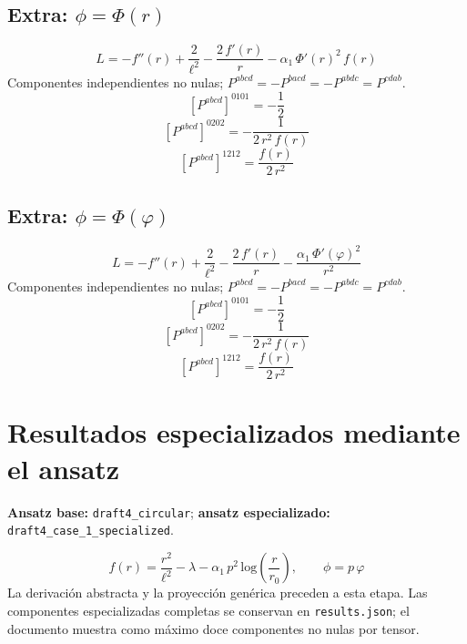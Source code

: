 \documentclass[11pt]{article}
\begin{document}
\subsection*{Extra: $\phi=\Phi\!\left(r\right)$}
\begin{dmath*}[breakdepth={5}]
L=-f''\!\left(r\right) + \frac{2}{{\ell}^{2}} - \frac{2\,f'\!\left(r\right)}{r} - \alpha_{1}\,{\Phi'\!\left(r\right)}^{2}\,f\!\left(r\right)
\end{dmath*}
Componentes independientes no nulas; $P^{abcd}=-P^{bacd}=-P^{abdc}=P^{cdab}$.
\begin{dmath*}[breakdepth={5}]
\left[P^{abcd}\right]^{0101}=-\frac{1}{2}
\end{dmath*}
\begin{dmath*}[breakdepth={5}]
\left[P^{abcd}\right]^{0202}=-\frac{1}{2\,{r}^{2}\,f\!\left(r\right)}
\end{dmath*}
\begin{dmath*}[breakdepth={5}]
\left[P^{abcd}\right]^{1212}=\frac{f\!\left(r\right)}{2\,{r}^{2}}
\end{dmath*}
\subsection*{Extra: $\phi=\Phi\!\left(\varphi\right)$}
\begin{dmath*}[breakdepth={5}]
L=-f''\!\left(r\right) + \frac{2}{{\ell}^{2}} - \frac{2\,f'\!\left(r\right)}{r} - \frac{\alpha_{1}\,{\Phi'\!\left(\varphi\right)}^{2}}{{r}^{2}}
\end{dmath*}
Componentes independientes no nulas; $P^{abcd}=-P^{bacd}=-P^{abdc}=P^{cdab}$.
\begin{dmath*}[breakdepth={5}]
\left[P^{abcd}\right]^{0101}=-\frac{1}{2}
\end{dmath*}
\begin{dmath*}[breakdepth={5}]
\left[P^{abcd}\right]^{0202}=-\frac{1}{2\,{r}^{2}\,f\!\left(r\right)}
\end{dmath*}
\begin{dmath*}[breakdepth={5}]
\left[P^{abcd}\right]^{1212}=\frac{f\!\left(r\right)}{2\,{r}^{2}}
\end{dmath*}
\section*{Resultados especializados mediante el ansatz}
\textbf{Ansatz base:} \texttt{draft4\_circular}; \textbf{ansatz especializado:} \texttt{draft4\_case\_1\_specialized}.\par
\begin{dmath*}[breakdepth={4}]
f\!\left(r\right) = \frac{{r}^{2}}{{\ell}^{2}} - \lambda - \alpha_{1}\,{p}^{2}\,\mathrm{log}\!\left(\frac{r}{r_{0}}\right),\qquad \phi = p\,\varphi
\end{dmath*}
La derivación abstracta y la proyección genérica preceden a esta etapa. Las componentes especializadas completas se conservan en \texttt{results.json}; el documento muestra como máximo doce componentes no nulas por tensor.
\end{document}

